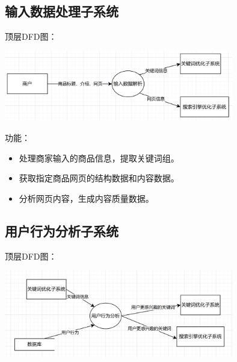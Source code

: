 \documentclass[11pt, a4paper, oneside]{ctexbook}
\begin{document}

\subsection{输入数据处理子系统}
顶层DFD图：

\includegraphics[width=0.75\textwidth]{输入数据解析2_2.png}

功能：
\begin{itemize}
    \item 处理商家输入的商品信息，提取关键词组。
    \item 获取指定商品网页的结构数据和内容数据。
    \item 分析网页内容，生成内容质量数据。
\end{itemize}



\subsection{用户行为分析子系统}
顶层DFD图：

\includegraphics[width=0.75\textwidth]{用户行为分析2_3.png}
\end{document}
